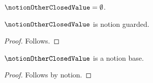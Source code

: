 

\begin{definition}\label{notion_other_closed_value}
    $\notionOtherClosedValue=\emptyset$.
\end{definition}

\begin{proposition}\label{notion_other_closed_value_guard}
    $\notionOtherClosedValue$ is notion guarded.
\end{proposition}
\begin{proof}
    Follows.
\end{proof}

\begin{proposition}\label{notion_other_closed_value_exact}
    $\notionOtherClosedValue$ is a notion base.
\end{proposition}
\begin{proof}
    Follows by notion.
\end{proof}
